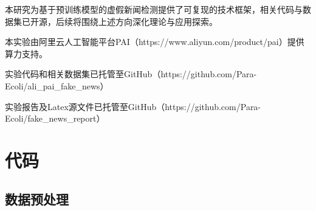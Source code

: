 \documentclass{cjc}
\begin{document}
本研究为基于预训练模型的虚假新闻检测提供了可复现的技术框架，相关代码与数据集已开源，后续将围绕上述方向深化理论与应用探索。

\hspace*{\fill}

\begin{acknowledgments}

本实验由阿里云人工智能平台PAI（https://www.aliyun.com/product/pai）提供算力支持。

实验代码和相关数据集已托管至GitHub（https://github.com/Para-Ecoli/ali\_pai\_fake\_news）

实验报告及Latex源文件已托管至GitHub（https://github.com/Para-Ecoli/fake\_news\_report）

\end{acknowledgments}





\newpage

\appendix

\section{代码}

\subsection{数据预处理}
\end{document}
